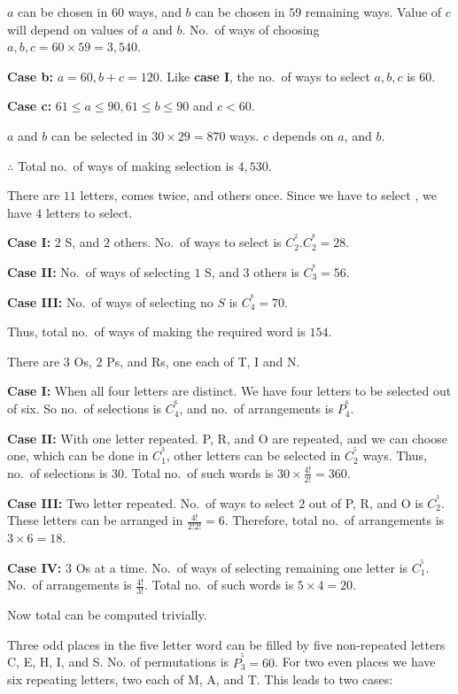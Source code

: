   $a$ can be chosen in $60$ ways, and $b$ can be chosen in $59$ remaining ways. Value of $c$ will depend on
  values of $a$ and $b$. No.\ of ways of choosing $a, b, c = 60\times59 = 3,540$.

  {\bf Case b:} $a = 60, b + c = 120$. Like {\bf case I}, the no.\ of ways to select $a, b, c$ is $60$.

  {\bf Case c:} $61\leq a\leq 90, 61\leq b\leq 90$ and $c < 60$.

  $a$ and $b$ can be selected in $30\times29 = 870$ ways. $c$ depends on $a$, and $b$.

  $\therefore$ Total no.\ of ways of making selection is $4,530$.
\item There are $11$ letters,  comes twice, and others once. Since we have to select , we
  have $4$ letters to select.

  {\bf Case I:} $2$ S, and $2$ others. No.\ of ways to select is $C_2^^2.C_2^^8 = 28$.

  {\bf Case II:} No.\ of ways of selecting $1$ S, and $3$ others is $C_3^^8 = 56$.

  {\bf Case III:} No.\ of ways of selecting no $S$ is $C_4^^8 = 70$.

  Thus, total no.\ of ways of making the required word is $154$.
\item There are $3$ O\symbol[rightquote]s, $2$ P\symbol[rightquote]s, and R\symbol[rightquote]s, one each of
  T, I and N.

  {\bf Case I:} When all four letters are distinct. We have four letters to be selected out of six. So
  no.\ of selections is $C_4^^6$, and no.\ of arrangements is $P_4^^6$.

  {\bf Case II:} With one letter repeated. P, R, and O are repeated, and we can choose one, which can be
  done in $C_1^^3$, other letters can be selected in $C_2^^5$ ways. Thus, no.\ of selections is $30$. Total
  no.\ of such words is $30\times\frac{4!}{2!} = 360$.

  {\bf Case III:} Two letter repeated. No.\ of ways to select $2$ out of P, R, and O is $C_2^^3$. These
  letters can be arranged in $\frac{4!}{2!2!} = 6$. Therefore, total no.\ of arrangements is $3\times6 =
  18$.

  {\bf Case IV:} $3$ O\symbol[rightquote]s at a time. No.\ of ways of selecting remaining one letter is
  $C_1^^5$. No.\ of arrangements is $\frac{4!}{3!}$. Total no.\ of such words is $5\times4 = 20$.

  Now total can be computed trivially.
\item Three odd places in the five letter word can be filled by five non-repeated letters C, E, H, I, and
  S. No. of permutations is $P_3^^5 = 60$. For two even places we have six repeating letters, two each of M,
  A, and T. This leads to two cases:

